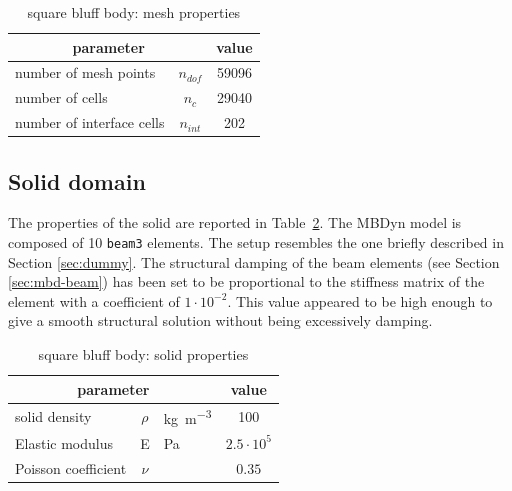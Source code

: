 \begin{table}[!htb]
	\begin{center}
		\begin{tabular}{ l c | c } 
			\multicolumn{2}{c|}{parameter} & value   \\ 
			\hline
			number of mesh points  & $n_{dof}$ & 59096     \\
			number of cells & $n_c$ & 29040  \\
			number of interface cells  & $n_{int}$ & 202  \\			
		\end{tabular}
	\end{center}
	\caption{square bluff body: mesh properties}
	\label{table:sq-mesh}
\end{table}


\subsection{Solid domain}

The properties of the solid are reported in Table~\ref{table:sq-solid}.
The MBDyn model is composed of 10 \texttt{beam3} elements. The setup resembles the one briefly described in Section \ref{sec:dummy}. The structural damping of the beam elements (see Section \ref{sec:mbd-beam}) has been set to be proportional to the stiffness matrix of the element with a coefficient of $1\cdot10^{-2}$. This value appeared to be high enough to give a smooth structural solution without being excessively damping.

\begin{table}[!htb]
	\begin{center}
		\begin{tabular}{ l c  l | c } 
			\multicolumn{3}{c|}{parameter} & value    \\ 
			\hline
			solid density  & $\rho$ & \si{kg.m^{-3}} & 100    \\
			Elastic modulus  & E & \si{Pa} & $2.5\cdot 10^5$    \\
			Poisson coefficient & $\nu$ & & $0.35$  \\
		\end{tabular}
	\end{center}
	\caption{square bluff body: solid properties}
	\label{table:sq-solid}
\end{table}


